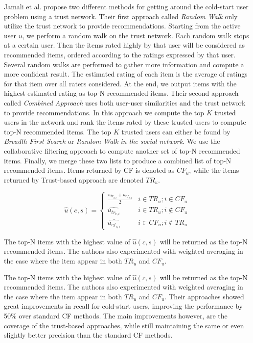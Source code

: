 

Jamali et al. \cite{Jamali2009} propose two different methods for getting
around the cold-start user problem using a trust network. Their first approach
called \emph{Random Walk} only utilize the trust network to provide
recommendations. Starting from the active user $u$, we perform a random walk on
the trust network. Each random walk stops at a certain user. Then the items
rated highly by that user will be considered as recommended items, ordered
according to the ratings expressed by that user. Several random walks are
performed to gather more information and compute a more confident result. The
estimated rating of each item is the average of ratings for that item over all
raters considered. At the end, we output items with the highest estimated
rating as top-N recommended items. Their second approach called \emph{Combined
Approach} uses both user-user similarities and the trust network to provide
recommendations. In this approach we compute the top $K$ trusted users in the
network and rank the items rated by these trusted users to compute top-N
recommended items. The top $K$ trusted users can either be found by
\emph{Breadth First Search} or \emph{Random Walk in the social network}. We use
the collaborative filtering approach to compute another set of top-N
recommended items. Finally, we merge these two lists to produce a combined list
of top-N recommended items. Items returned by CF is denoted as $CF_{u}$, while
the items returned by Trust-based approach are denoted $TR_{u}$.

\begin{equation}
 \hat{u}(c,s) =
  \begin{cases}
   \frac{u_{tr_{c,i}}+u_{cf_{c,i}}}{2}     & i \in TR_{u};i \in CF_{u}         \\
   \hat{u_{tr_{c,i}}}                      & i \in TR_{u};i \not \in CF_{u}    \\
   \hat{u_{cf_{c,i}}}                      & i \in CF_{u};i \not \in TR_{u} 	\end{cases}
\end{equation}

The top-N items with the highest value of $\hat{u}(c,s)$ will be returned as
the top-N recommended items. The authors also experimented with weighted
averaging in the case where the item appear in both $TR_{u}$ and $CF_{u}$.

The top-N items with the highest value of $\hat{u}(c,s)$ will be returned as
the top-N recommended items. The authors also experimented with weighted
averaging in the case where the item appear in both $TR_{u}$ and $CF_{u}$.
Their approaches showed great improvements in recall for cold-start users,
improving the performance by 50\% over standard CF methods. The main
improvements however, are the coverage of the trust-based approaches, while
still maintaining the same or even slightly better precision than the standard
CF methods.

